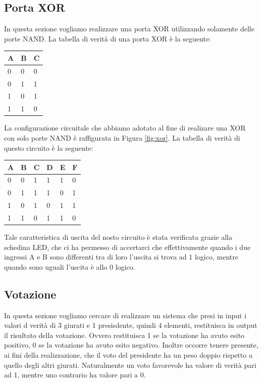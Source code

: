 \subsection*{Porta XOR}

In questa sezione vogliamo realizzare una porta XOR utilizzando solamente delle porte NAND. La tabella di verità di una porta XOR è la seguente:
\begin{center}
	\begin{tabular}{lll}
	\toprule
		A & B & C \\
	\midrule
		0 & 0 & 0 \\
		0 & 1 & 1 \\
		1 & 0 & 1 \\
		1 & 1 & 0 \\
	\bottomrule
	\end{tabular}
\end{center}
La configurazione circuitale che abbiamo adotato al fine di realizare una XOR con solo porte NAND è raffigurata in Figura \ref{fig:xor}. La tabella di verità di questo circuito è la seguente:
\begin{center}
	\begin{tabular}{llllll}
	\toprule
		A & B & C & D & E & F \\
	\midrule
		0 & 0 & 1 & 1 & 1 & 0 \\
		0 & 1 & 1 & 1 & 0 & 1 \\
		1 & 0 & 1 & 0 & 1 & 1 \\
		1 & 1 & 0 & 1 & 1 & 0 \\
	\bottomrule
	\end{tabular}
\end{center}
Tale caratteristica di uscita del nosto circuito è stata verificata grazie alla schedina LED, che ci ha permesso di accertarci che effettivamente quando i due ingressi A e B sono differenti tra di loro l'uscita si trova ad 1 logico, mentre quando sono uguali l'uscita è allo 0 logico.

\subsection*{Votazione}

In questa sezione vogliamo cercare di realizzare un sistema che presi in input i valori d verità di 3 giurati e 1 presisdente, quindi 4 elementi, restituisca in output il risultato della votazione. Ovvero restituisca 1 se la votazione ha avuto esito positivo, 0 se la votazione ha avuto esito negativo. Inoltre occorre tenere presente, ai fini della realizzazione, che il voto del presidente ha un peso doppio rispetto a quello degli altri giurati. Naturalmente un voto favorevole ha valore di verità pari ad 1, mentre uno contrario ha valore pari a 0.

